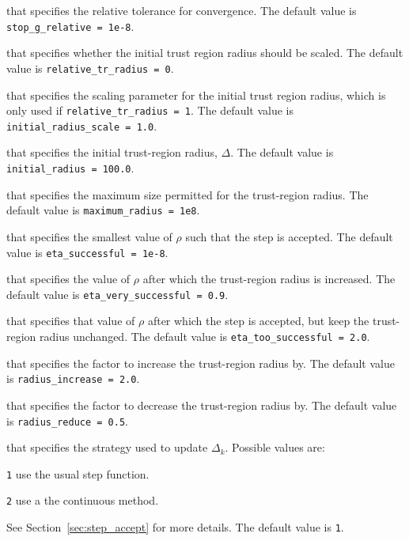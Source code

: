 \begin{description}
that specifies the relative tolerance for convergence.
The default value is {\tt stop\_g\_relative = 1e{-8}}.

that specifies whether the initial trust region radius should be scaled.
The default value is {\tt relative\_tr\_radius = 0}.

that specifies the scaling parameter for the initial trust region radius, which is only used if {\tt relative\_tr\_radius = 1}.
The default value is {\tt initial\_radius\_scale = 1.0}.

that specifies the initial trust-region radius, $\Delta$.
The default value is {\tt initial\_radius = 100.0}.

that specifies the maximum size permitted for the trust-region radius.
The default value is {\tt maximum\_radius = 1e8}.

that specifies the smallest value of $\rho$ such that the step is accepted.
The default value is {\tt eta\_successful = 1e-8}.


that specifies the value of $\rho$ after which the trust-region radius is increased.
The default value is {\tt eta\_very\_successful = 0.9}.

that specifies that value of $\rho$ after which the step is accepted, but keep the trust-region radius unchanged.
The default value is {\tt eta\_too\_successful = 2.0}.

that specifies the factor to increase the trust-region radius by.
The default value is {\tt radius\_increase = 2.0}.

that specifies the factor to decrease the trust-region radius by.
The default value is {\tt radius\_reduce = 0.5}.

that specifies the strategy used to update $\Delta_k$.  Possible values are:
\begin{description}
\item {\tt 1} use the usual step function.
\item {\tt 2} use a the continuous method.
\end{description}
See Section~\ref{sec:step_accept} for more details.
The default value is {\tt 1}.


\end{description}
